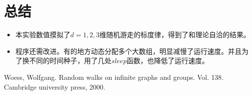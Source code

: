 \documentclass[UTF8]{ctexart}
\begin{document}
%		
%		
%	
%		
%		


	


	\newpage
	\section{总结}
	\begin{itemize}
		\item 本实验数值摸拟了$d=1,2,3$维随机游走的标度律，得到了和理论自洽的结果。
		\item 程序还需改进。有的地方动态分配多个大数组，明显减慢了运行速度。并且为了换不同的时间种子，用了几处$sleep$函数，也降低了运行速度。
	\end{itemize}
	
	
	\begin{thebibliography}{99}  
		Woess, Wolfgang. Random walks on infinite graphs and groups. Vol. 138. Cambridge university press, 2000.
	\end{thebibliography}
\end{document}
